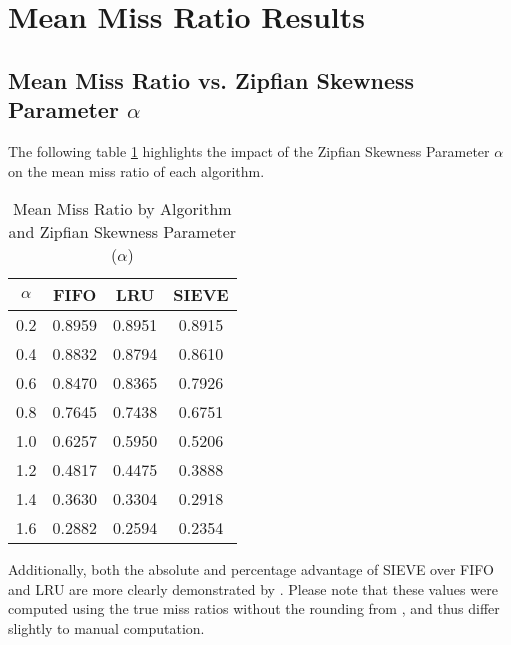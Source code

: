 \section{Mean Miss Ratio Results}\label{appendix:mean-miss-ratio}

\subsection{Mean Miss Ratio vs. Zipfian Skewness Parameter $\alpha$}

The following table \cref{tab: miss_ratio_by_alpha} highlights the impact of the Zipfian Skewness Parameter $\alpha$ on the mean miss ratio of each algorithm.

\begin{table}[h!]
    \centering
    \caption{Mean Miss Ratio by Algorithm and Zipfian Skewness Parameter ($\alpha$)}
    \label{tab: miss_ratio_by_alpha}
    \begin{tabular}{c c c c}
        \toprule
        \textbf{$\alpha$} & \textbf{FIFO} & \textbf{LRU} & \textbf{SIEVE} \\
        \midrule
        0.2 & 0.8959 & 0.8951 & 0.8915 \\
        0.4 & 0.8832 & 0.8794 & 0.8610 \\
        0.6 & 0.8470 & 0.8365 & 0.7926 \\
        0.8 & 0.7645 & 0.7438 & 0.6751 \\
        1.0 & 0.6257 & 0.5950 & 0.5206 \\
        1.2 & 0.4817 & 0.4475 & 0.3888 \\
        1.4 & 0.3630 & 0.3304 & 0.2918 \\
        1.6 & 0.2882 & 0.2594 & 0.2354 \\
        \bottomrule
    \end{tabular}
\end{table}

Additionally, both the absolute and percentage advantage of SIEVE over FIFO and LRU are more clearly demonstrated by . Please note that these values were computed using the true miss ratios without the rounding from , and thus differ slightly to manual computation.

